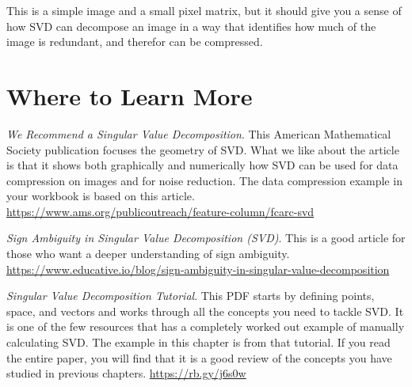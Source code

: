 This is a simple image and a small pixel matrix, but it should give you a sense of how SVD can decompose an image in a way that identifies how much of the image is redundant, and therefor can be compressed.

\section{Where to Learn More}
\emph {We Recommend a Singular Value Decomposition}. This American Mathematical Society publication focuses the geometry of SVD. What we like about the article is that it shows both graphically and numerically how SVD can be used for data compression on images and for noise reduction. The data compression example in your workbook is based on this article. \url{https://www.ams.org/publicoutreach/feature-column/fcarc-svd}

\emph {Sign Ambiguity in Singular Value Decomposition (SVD)}. This is a good article for those who want a deeper understanding of sign ambiguity. \url{https://www.educative.io/blog/sign-ambiguity-in-singular-value-decomposition}

\emph {Singular Value Decomposition Tutorial}. This PDF starts by defining points, space, and vectors and works through all the concepts you need to tackle SVD. It is one of the few resources that has a completely worked out example of manually calculating SVD. The example in this chapter is from that tutorial. If you read the entire paper, you will find that it is a good review of the concepts you have studied in previous chapters. \url{https://rb.gy/j6s0w}
